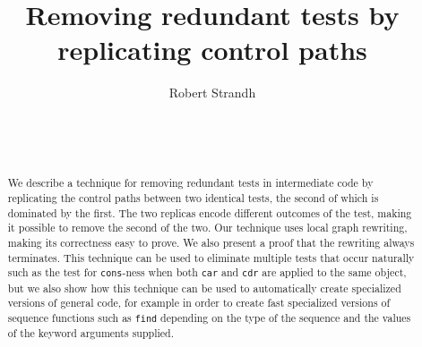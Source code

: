 \documentclass{sig-alternate-05-2015}
\def\inputtex#1{}
\begin{document}
\title{Removing redundant tests by replicating control paths}
\author{\alignauthor
Robert Strandh\\
\\
\\
\\
}

\maketitle

\begin{abstract}
We describe a technique for removing redundant tests in intermediate
code by replicating the control paths between two identical tests, the
second of which is dominated by the first.  The two replicas encode
different outcomes of the test, making it possible to remove the
second of the two.  Our technique uses local graph rewriting, making
its correctness easy to prove.  We also present a proof that the
rewriting always terminates.  This technique can be used to eliminate
multiple tests that occur naturally such as the test for
\texttt{cons}-ness when both \texttt{car} and \texttt{cdr} are applied
to the same object, but we also show how this technique can be used to
automatically create specialized versions of general code, for example
in order to create fast specialized versions of sequence functions
such as \texttt{find} depending on the type of the sequence and the
values of the keyword arguments supplied.
\end{abstract}








\end{document}
